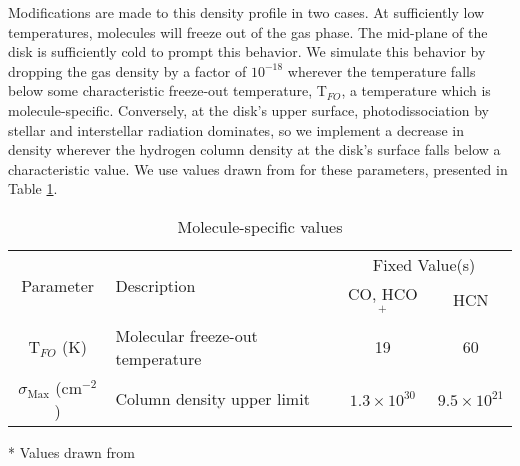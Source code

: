 
Modifications are made to this density profile in two cases. At sufficiently low temperatures, molecules will freeze out of the gas phase. The mid-plane of the disk is sufficiently cold to prompt this behavior. We simulate this behavior by dropping the gas density by a factor of $10^{-18}$ wherever the temperature falls below some characteristic freeze-out temperature, T$_{FO}$, a temperature which is molecule-specific. Conversely, at the disk's upper surface, photodissociation by stellar and interstellar radiation dominates, so we implement a decrease in density wherever the hydrogen column density at the disk's surface falls below a characteristic value. We use values drawn from \cite{Factor2017} for these parameters, presented in Table \ref{tab:mol_specifics}.


\begin{table}
  \begin{threeparttable}
    \centering
    \caption{Molecule-specific values}
    \label{tab:mol_specifics}
    \renewcommand{\arraystretch}{1.2}
    \begin{tabular}{c  l  c c }
      \toprule \toprule
      \multirow{2}{*}{Parameter} & \multirow{2}{*}{Description}    & \multicolumn{2}{c}{Fixed Value(s)} \\
                                 &                                 & CO, HCO$^+$ & HCN \\
      \midrule %
      T$_{FO}$ (K)           &  Molecular freeze-out temperature   &  19 & 60    \\
      $\sigma_\text{Max}$ (cm$^{-2}$) & Column density upper limit &  $1.3 \times 10^{30}$ & $9.5 \times 10^{21}$  \\
      \bottomrule
    \end{tabular}
    \begin{tablenotes}\footnotesize
      \item[*] Values drawn from \cite{Factor2017}
    \end{tablenotes}
  \end{threeparttable}
\end{table}



